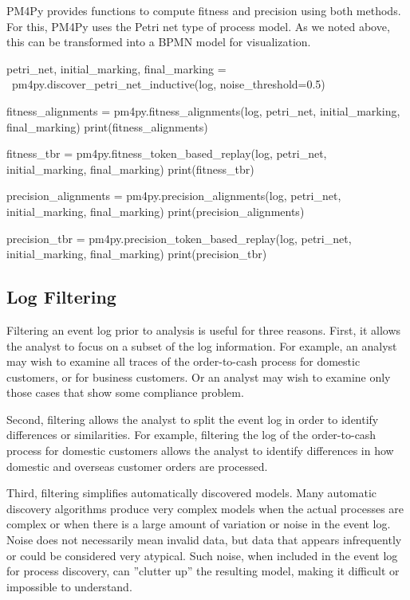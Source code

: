PM4Py provides functions to compute fitness and precision using both methods. For this, PM4Py uses the Petri net type of process model. As we noted above, this can be transformed into a BPMN model for visualization. 

\begin{pythoncode}
petri_net, initial_marking, final_marking = \
    pm4py.discover_petri_net_inductive(log, noise_threshold=0.5)

fitness_alignments = pm4py.fitness_alignments(log,
    petri_net, initial_marking, final_marking)
print(fitness_alignments)

fitness_tbr = pm4py.fitness_token_based_replay(log, 
    petri_net, initial_marking, final_marking)
print(fitness_tbr)

precision_alignments = pm4py.precision_alignments(log,
    petri_net, initial_marking, final_marking)
print(precision_alignments)

precision_tbr = pm4py.precision_token_based_replay(log, 
    petri_net, initial_marking, final_marking)
print(precision_tbr)
\end{pythoncode}

\subsection*{Log Filtering}

Filtering an event log prior to analysis is useful for three reasons. First, it allows the analyst to focus on a subset of the log information. For example, an analyst may wish to examine all traces of the order-to-cash process for domestic customers, or for business customers. Or an analyst may wish to examine only those cases that show some compliance problem. 

Second, filtering allows the analyst to split the event log in order to identify differences or similarities. For example, filtering the log of the order-to-cash process for domestic customers allows the analyst to identify differences in how domestic and overseas customer orders are processed. 

Third, filtering simplifies automatically discovered models. Many automatic discovery algorithms produce very complex models when the actual processes are complex or when there is a large amount of variation or noise in the event log. Noise does not necessarily mean invalid data, but data that appears infrequently or could be considered very atypical. Such noise, when included in the event log for process discovery, can ''clutter up'' the resulting model, making it difficult or impossible to understand.

